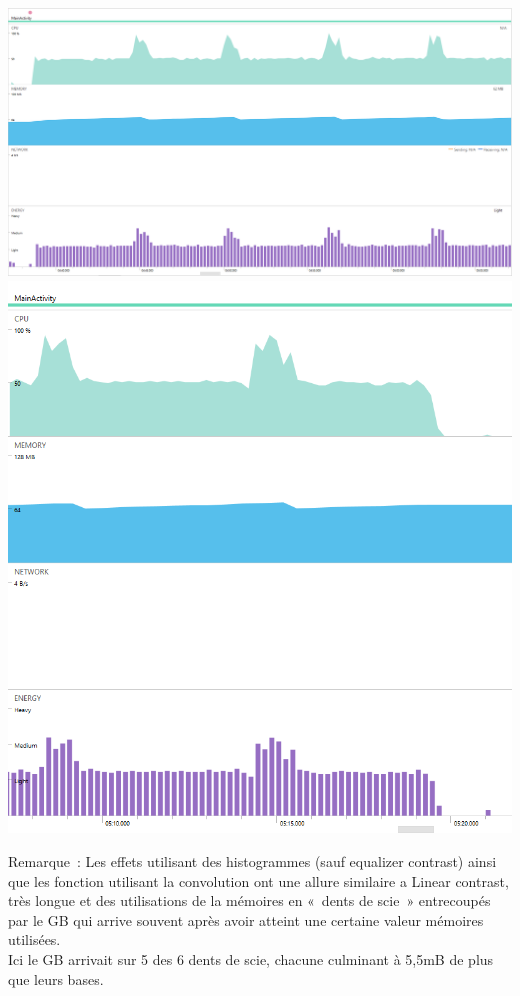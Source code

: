 \documentclass[12pt]{article}
\begin{document}
    \includegraphics{linelong1}
    \includegraphics{linelong2}

    Remarque : 
    Les effets utilisant des histogrammes (sauf equalizer contrast) ainsi que les fonction utilisant la convolution ont une allure similaire a Linear contrast, très longue et des utilisations de la mémoires en « dents de scie » entrecoupés par le GB qui arrive souvent après avoir atteint une certaine valeur mémoires utilisées.\\
    Ici le GB arrivait sur 5 des 6 dents de scie, chacune culminant à 5,5mB de plus que leurs bases.\\
\end{document}
